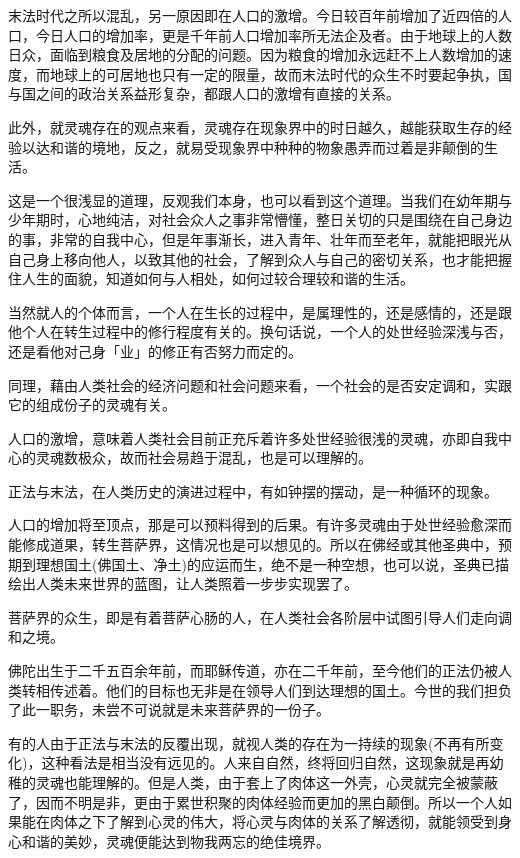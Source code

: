 \documentclass[twoside,openany]{book}
\begin{document}
末法时代之所以混乱，另一原因即在人口的激增。今日较百年前增加了近四倍的人口，今日人口的增加率，更是千年前人口增加率所无法企及者。由于地球上的人数日众，面临到粮食及居地的分配的问题。因为粮食的增加永远赶不上人数增加的速度，而地球上的可居地也只有一定的限量，故而末法时代的众生不时要起争执，国与国之间的政治关系益形复杂，都跟人口的激增有直接的关系。

此外，就灵魂存在的观点来看，灵魂存在现象界中的时日越久，越能获取生存的经验以达和谐的境地，反之，就易受现象界中种种的物象愚弄而过着是非颠倒的生活。

这是一个很浅显的道理，反观我们本身，也可以看到这个道理。当我们在幼年期与少年期时，心地纯洁，对社会众人之事非常懵懂，整日关切的只是围绕在自己身边的事，非常的自我中心，但是年事渐长，进入青年、壮年而至老年，就能把眼光从自己身上移向他人，以致其他的社会，了解到众人与自己的密切关系，也才能把握住人生的面貌，知道如何与人相处，如何过较合理较和谐的生活。

当然就人的个体而言，一个人在生长的过程中，是属理性的，还是感情的，还是跟他个人在转生过程中的修行程度有关的。换句话说，一个人的处世经验深浅与否，还是看他对己身「业」的修正有否努力而定的。

同理，藉由人类社会的经济问题和社会问题来看，一个社会的是否安定调和，实跟它的组成份子的灵魂有关。

人口的激增，意味着人类社会目前正充斥着许多处世经验很浅的灵魂，亦即自我中心的灵魂数极众，故而社会易趋于混乱，也是可以理解的。

正法与末法，在人类历史的演进过程中，有如钟摆的摆动，是一种循环的现象。

人口的增加将至顶点，那是可以预料得到的后果。有许多灵魂由于处世经验愈深而能修成道果，转生菩萨界，这情况也是可以想见的。所以在佛经或其他圣典中，预期到理想国土(佛国土、净土)的应运而生，绝不是一种空想，也可以说，圣典已描绘出人类未来世界的蓝图，让人类照着一步步实现罢了。

菩萨界的众生，即是有着菩萨心肠的人，在人类社会各阶层中试图引导人们走向调和之境。

佛陀出生于二千五百余年前，而耶稣传道，亦在二千年前，至今他们的正法仍被人类转相传述着。他们的目标也无非是在领导人们到达理想的国土。今世的我们担负了此一职务，未尝不可说就是未来菩萨界的一份子。

有的人由于正法与末法的反覆出现，就视人类的存在为一持续的现象(不再有所变化)，这种看法是相当没有远见的。人来自自然，终将回归自然，这现象就是再幼稚的灵魂也能理解的。但是人类，由于套上了肉体这一外壳，心灵就完全被蒙蔽了，因而不明是非，更由于累世积聚的肉体经验而更加的黑白颠倒。所以一个人如果能在肉体之下了解到心灵的伟大，将心灵与肉体的关系了解透彻，就能领受到身心和谐的美妙，灵魂便能达到物我两忘的绝佳境界。
\end{document}
